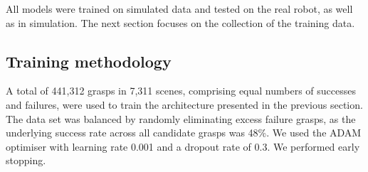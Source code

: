 All models were trained on simulated data and tested on the real robot, as well as in simulation. The next section focuses on the collection of the training data.

\subsection{Training methodology}
A total of 441,312 grasps in 7,311 scenes, comprising equal numbers of successes and failures, were used to train the architecture presented in the previous section. The data set was balanced by randomly eliminating excess failure grasps, as the underlying success rate across all candidate grasps was 48\%. We used the ADAM optimiser with learning rate 0.001 and a dropout rate of 0.3. We performed early stopping.